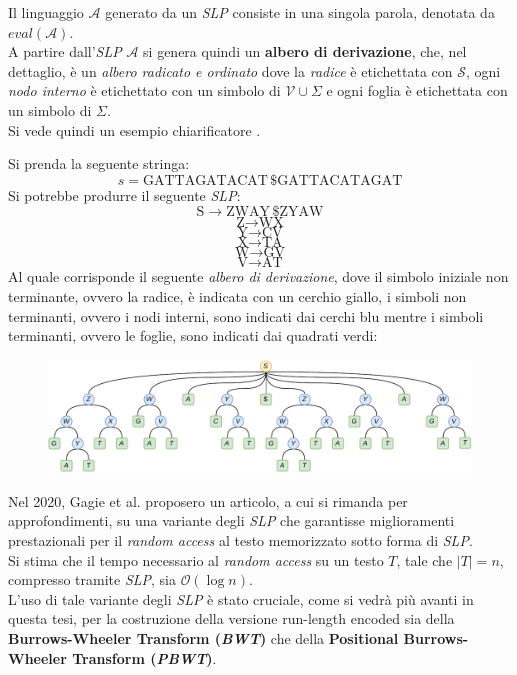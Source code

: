 Il linguaggio $\mathcal{A}$ generato da un \textit{SLP}
consiste in una singola parola, denotata da $eval(\mathcal{A})$. \\
A partire dall'\textit{SLP} $\mathcal{A}$ si genera quindi un \textbf{albero
  di derivazione}, che, nel dettaglio, è un \textit{albero radicato e ordinato}
dove la \textit{radice} è etichettata con $\mathcal{S}$, ogni \textit{nodo
  interno} è etichettato con un simbolo di $\mathcal{V}\cup\Sigma$ e ogni foglia
è etichettata con un simbolo di $\Sigma$.\\
Si vede quindi un esempio chiarificatore \cite{slpgagie}.
\begin{esempio}
  \label{ese:slpgagie}
  Si prenda la seguente stringa:
  \[s=\mbox{GATTAGATACAT}\,\$\mbox{GATTACATAGAT}\]
  Si potrebbe produrre il seguente \emph{SLP}:
  \[\mbox{S}\to \mbox{ZWAY}\,\$\mbox{ZYAW}\]
  \[\mbox{Z}\to \mbox{WX}\]
  \[\mbox{Y}\to \mbox{CV}\]
  \[\mbox{X}\to \mbox{TA}\]
  \[\mbox{W}\to \mbox{GV}\]
  \[\mbox{V}\to \mbox{AT}\]
  Al quale corrisponde il seguente \emph{albero di derivazione}, dove il simbolo
  iniziale non terminante, ovvero la radice, è indicata con un cerchio giallo, i
  simboli non terminanti, ovvero i nodi interni, sono indicati dai cerchi blu
  mentre i simboli terminanti, ovvero le foglie, sono indicati dai quadrati
  verdi:
  \begin{figure}[H]
    \centering
    \includegraphics[width=\textwidth]{img/slpgagie.pdf}
  \end{figure}
\end{esempio}
Nel 2020, Gagie et al. \cite{slpgagie} 
proposero un articolo, a cui si rimanda per approfondimenti, su una variante
degli \textit{SLP} che garantisse miglioramenti 
prestazionali per il \textit{random access} al testo memorizzato sotto forma di
\textit{SLP}.\\
Si stima che il tempo necessario al
\textit{random access} su un testo $T$, tale che $|T|=n$, compresso tramite
\textit{SLP}, sia $\mathcal{O}\left(\log n\right)$.\\
L'uso di tale variante degli \textit{SLP} è stato cruciale, come si vedrà più
avanti in questa tesi, per la costruzione della versione run-length encoded sia
della \textbf{Burrows-Wheeler Transform (\textit{BWT})} che della
\textbf{Positional Burrows-Wheeler Transform (\textit{PBWT})}.

